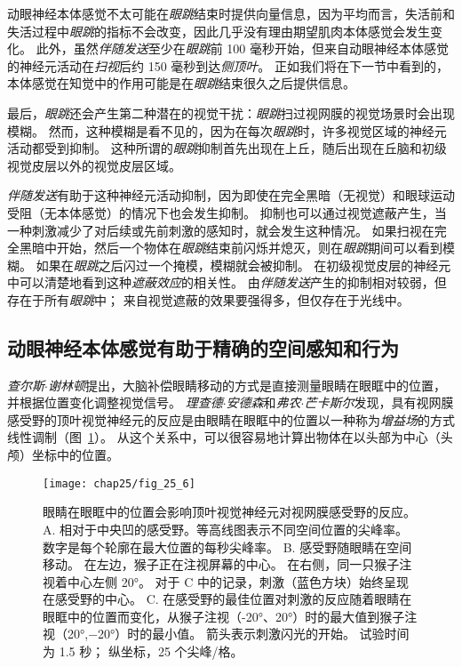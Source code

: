 动眼神经本体感觉不太可能在\textit{眼跳}结束时提供向量信息，因为平均而言，失活前和失活过程中\textit{眼跳}的指标不会改变，因此几乎没有理由期望肌肉本体感觉会发生变化。
此外，虽然\textit{伴随发送}至少在\textit{眼跳}前 100 毫秒开始，但来自动眼神经本体感觉的神经元活动在\textit{扫视}后约 150 毫秒到达\textit{侧顶叶}。
正如我们将在下一节中看到的，本体感觉在知觉中的作用可能是在\textit{眼跳}结束很久之后提供信息。


最后，\textit{眼跳}还会产生第二种潜在的视觉干扰：\textit{眼跳}扫过视网膜的视觉场景时会出现模糊。
然而，这种模糊是看不见的，因为在每次\textit{眼跳}时，许多视觉区域的神经元活动都受到抑制。
这种所谓的\textit{眼跳}抑制首先出现在上丘，随后出现在丘脑和初级视觉皮层以外的视觉皮层区域。


\textit{伴随发送}有助于这种神经元活动抑制，因为即使在完全黑暗（无视觉）和眼球运动受阻（无本体感觉）的情况下也会发生抑制。
抑制也可以通过视觉遮蔽产生，当一种刺激减少了对后续或先前刺激的感知时，就会发生这种情况。
如果扫视在完全黑暗中开始，然后一个物体在\textit{眼跳}结束前闪烁并熄灭，则在\textit{眼跳}期间可以看到模糊。
如果在\textit{眼跳}之后闪过一个掩模，模糊就会被抑制。
在初级视觉皮层的神经元中可以清楚地看到这种\textit{遮蔽效应}的相关性。
由\textit{伴随发送}产生的抑制相对较弱，但存在于所有\textit{眼跳}中；
来自视觉遮蔽的效果要强得多，但仅存在于光线中。



\subsection{动眼神经本体感觉有助于精确的空间感知和行为}

\textit{查尔斯$\cdot$谢林顿}提出，大脑补偿眼睛移动的方式是直接测量眼睛在眼眶中的位置，并根据位置变化调整视觉信号。
\textit{理查德$\cdot$安德森}和\textit{弗农$\cdot$芒卡斯尔}发现，具有视网膜感受野的顶叶视觉神经元的反应是由眼睛在眼眶中的位置以一种称为\textit{增益场}的方式线性调制（图~\ref{fig:25_6}）。
从这个关系中，可以很容易地计算出物体在以头部为中心（头颅）坐标中的位置。


\begin{figure}[htbp]
	\centering
	\texttt{[image: chap25/fig\_25\_6]}
	\caption{眼睛在眼眶中的位置会影响顶叶视觉神经元对视网膜感受野的反应。
		A. 相对于中央凹的感受野。等高线图表示不同空间位置的尖峰率。
		数字是每个轮廓在最大位置的每秒尖峰率。
		B. 感受野随眼睛在空间移动。
		在左边，猴子正在注视屏幕的中心。
		在右侧，同一只猴子注视着中心左侧 20°。
		对于 C 中的记录，刺激（蓝色方块）始终呈现在感受野的中心。
		C. 在感受野的最佳位置对刺激的反应随着眼睛在眼眶中的位置而变化，从猴子注视（-20°、20°）时的最大值到猴子注视（20°,−20°）时的最小值。
		箭头表示刺激闪光的开始。
		试验时间为 1.5 秒；
		纵坐标，25 个尖峰/格\cite{andersen1985encoding}。}
	\label{fig:25_6}
\end{figure}



